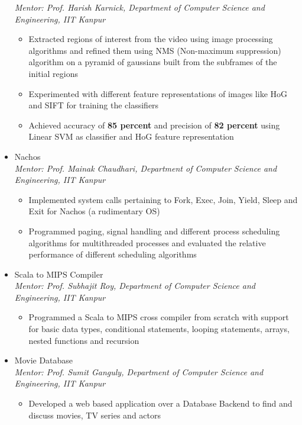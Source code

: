\documentclass{article}
\begin{document}
\begin{itemize}[leftmargin=0.07cm]
\emph{Mentor: Prof. Harish Karnick, Department of Computer Science and Engineering, IIT Kanpur
}	\begin{itemize}
	\item Extracted regions of interest from the video using image processing algorithms and refined them using NMS
(Non-maximum suppression) algorithm on a pyramid of gaussians built from the subframes of the initial regions
	\item Experimented with different feature representations of images like HoG and SIFT for training the classifiers
	\item Achieved accuracy of \textbf{85 percent} and precision of \textbf{82 percent} using Linear SVM as classifier and HoG feature representation
	\end{itemize}

\item[] {\large Nachos}\hspace*{\fill}\\
\emph{Mentor: Prof. Mainak Chaudhari, Department of Computer Science and Engineering, IIT Kanpur
}	\begin{itemize}
	\item Implemented system calls pertaining to Fork, Exec, Join, Yield, Sleep and Exit for Nachos (a rudimentary OS)
	\item Programmed paging, signal handling and different process scheduling algorithms for multithreaded processes and evaluated the relative performance of different scheduling algorithms
	\end{itemize}
\item[] {\large Scala to MIPS Compiler}\hspace*{\fill}\\
\emph{Mentor: Prof. Subhajit Roy, Department of Computer Science and Engineering, IIT Kanpur
}	\begin{itemize}
	\item Programmed a Scala to MIPS cross compiler from scratch with support for basic data types, conditional statements, looping statements, arrays, nested functions and recursion
	\end{itemize}
	
\item[] {\large Movie Database}\hspace*{\fill}\\
\emph{Mentor: Prof. Sumit Ganguly, Department of Computer Science and Engineering, IIT Kanpur
}	\begin{itemize}
	\item Developed a web based application over a Database Backend to find and discuss movies, TV series and actors
	\end{itemize}


\end{itemize}
\end{document}
